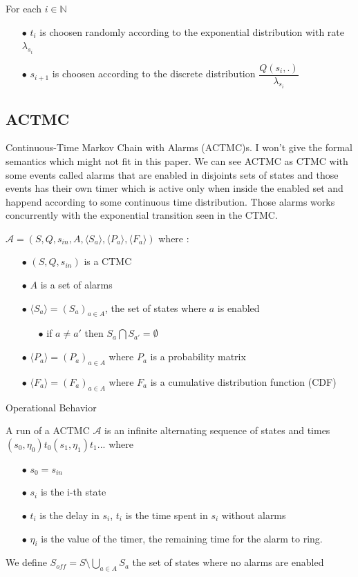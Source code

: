 \documentclass[runningheads,custombib]{llncs}
\begin{document}
For each $i \in \mathbb{N}$ \begin{itemize}
	\item[$\bullet$] $t_i$ is choosen randomly according to the exponential distribution with rate $\lambda_{s_i}$
	\item[$\bullet$] $s_{i+1}$ is choosen according to the discrete distribution $\dfrac{Q(s_i,.)}{\lambda_{s_i}}$
\end{itemize}

\subsection{ACTMC}

Continuous-Time Markov Chain with Alarms (ACTMC)s. I won't give the formal semantics which might not fit in this paper. We can see ACTMC as CTMC with some events called alarms that are enabled in disjoints sets of states and those events has their own timer which is active only when inside the enabled set and happend according to some continuous time distribution. Those alarms works concurrently with the exponential transition seen in the CTMC.

$\mathcal{A} = (S,Q,s_{in},A,\langle S_a \rangle,\langle P_a \rangle,\langle F_a \rangle)$
where :
\begin{itemize}
	\item[$\bullet$]$(S,Q,s_{in})$ is a CTMC
	\item[$\bullet$] $A$ is a set of alarms
	\item[$\bullet$] $\langle S_a \rangle = (S_a)_{a \in A}$, the set of states where $a$ is enabled
		\begin{itemize}
			\item[$\bullet$] if $a \neq a'$ then $S_a \bigcap S_{a'} = \emptyset$ 
		\end{itemize}
	\item[$\bullet$]$\langle P_a \rangle = (P_a)_{a \in A}$ where $P_a$ is a probability matrix
	\item[$\bullet$]$\langle F_a \rangle = (F_a)_{a \in A}$ where $F_a$ is a cumulative distribution function (CDF) 
\end{itemize}

Operational Behavior

A run of a ACTMC $\mathcal{A}$ is an infinite alternating sequence of states and times $(s_0,\eta_0)t_0(s_1,\eta_1)t_1...$ where 
\begin{itemize}
	\item[$\bullet$] $s_0 = s_{in}$
	\item[$\bullet$] $s_i$ is the i-th state
	\item[$\bullet$] $t_i$ is the delay in $s_i$, $t_i$ is the time spent in $s_i$ without alarms
	\item[$\bullet$] $\eta_i$ is the value of the timer, the remaining time for the alarm to ring.
\end{itemize}
We define $S_{off} = S\setminus\bigcup_{a \in A} S_a$ the set of states where no alarms are enabled
\end{document}
